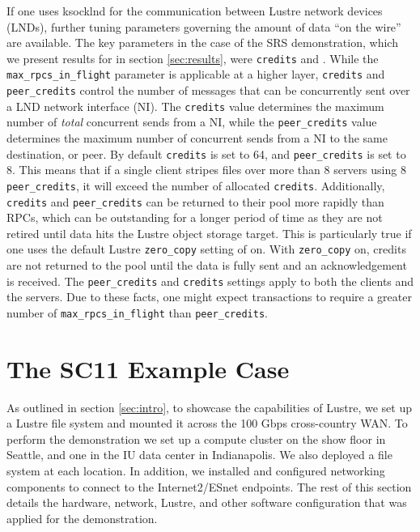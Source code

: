 \documentclass[]{sig-alternate}
\begin{document}
If one uses ksocklnd for the communication between Lustre network devices (LNDs), further tuning parameters
governing the amount of data ``on the wire'' are available. The key parameters in
the case of the SRS demonstration, which we present results for in section \ref{sec:results}, were 
{\tt credits} and . While the  {\tt max\_rpcs\_in\_flight} parameter is applicable at a higher
layer, {\tt credits} and {\tt peer\_credits} control the number of messages that can be concurrently sent over
a LND network interface (NI). The {\tt credits} value determines the maximum number of {\it total} concurrent
sends from a NI, while the {\tt peer\_credits} value determines the maximum number of concurrent sends from a
NI to the same destination, or peer. By default {\tt credits} is set to 64, and {\tt peer\_credits} is set to
8. This means that if a single client stripes files over more than 8 servers using 8 {\tt peer\_credits}, it
will exceed the number of allocated {\tt credits}. Additionally, {\tt credits} and {\tt peer\_credits} can be
returned to their pool more rapidly than RPCs, which can be outstanding for a longer period of time as they are not
retired until data hits the Lustre object storage target. This is particularly true if one uses the
default Lustre {\tt zero\_copy} setting of on. With {\tt zero\_copy} on, credits are not returned to the pool
until the data is fully sent and an acknowledgement is received. The {\tt peer\_credits} and {\tt credits}
settings apply to both the clients and the servers. Due to these facts, one might expect
transactions to require a greater number of {\tt max\_rpcs\_in\_flight} than {\tt peer\_credits}.
 

\section {The SC11 Example Case}\label{sec:usecase}

As outlined in section \ref{sec:intro}, to showcase the capabilities of Lustre, we set up a Lustre
file system and mounted it across the 100 Gbps cross-country WAN. To perform the demonstration we set up a
compute cluster on the show floor in Seattle, and one in the IU data center in Indianapolis. We also deployed a
file system at each location. In addition, we installed and configured networking components to connect to the
Internet2/ESnet endpoints. The rest of this section details the hardware, network, Lustre, and other software
configuration that was applied for the demonstration.
\end{document}
